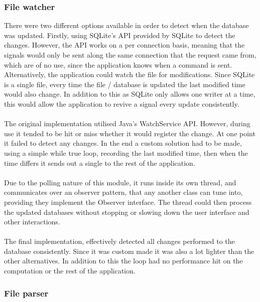\subsubsection{File watcher}
\label{subsubsec:file_watcher_imp}

There were two different options available in order to detect when the database was updated. Firstly, using SQLite's API provided by SQLite to detect the changes. However, the API works on a per connection basis, meaning that the signals would only be sent along the same connection that the request came from, which are of no use, since the application knows when a command is sent. Alternatively, the application could watch the file for modifications. Since SQLite is a single file, every time the file / database is updated the last modified time would also change. In addition to this as SQLite only allows one writer at a time, this would allow the application to revive a signal every update consistently.  
\\\\
The original implementation utilised Java's WatchService API. However, during use it tended to be hit or miss whether it would register the change. At one point it failed to detect any changes. In the end a custom solution had to be made, using a simple while true loop, recording the last modified time, then when the time differs it sends out a single to the rest of the application. 
\\\\
Due to the polling nature of this module, it runs inside its own thread, and communicates over an observer pattern, that any another class can tune into, providing they implement the Observer interface. The thread could then process the updated databases without stopping or slowing down the user interface and other interactions.
\\\\
The final implementation, effectively detected all changes performed to the database consistently. Since it was custom made it was also a lot lighter than the other alternatives. In addition to this the loop had no performance hit on the computation or the rest of the application.

\subsubsection{File parser}
\label{subsubsec:file_parser_imp}

